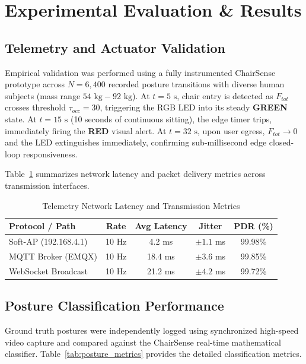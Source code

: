 \documentclass[conference]{IEEEtran}
\begin{document}
\section{Experimental Evaluation \& Results}

\subsection{Telemetry and Actuator Validation}
Empirical validation was performed using a fully instrumented ChairSense prototype across $N = 6,400$ recorded posture transitions with diverse human subjects (mass range $54\text{ kg} - 92\text{ kg}$). At $t = 5\text{ s}$, chair entry is detected as $F_{tot}$ crosses threshold $\tau_{occ} = 30$, triggering the RGB LED into its steady \textbf{GREEN} state. At $t = 15\text{ s}$ (10 seconds of continuous sitting), the edge timer trips, immediately firing the \textbf{RED} visual alert. At $t = 32\text{ s}$, upon user egress, $F_{tot} \to 0$ and the LED extinguishes immediately, confirming sub-millisecond edge closed-loop responsiveness.

Table~\ref{tab:latency} summarizes network latency and packet delivery metrics across transmission interfaces.

\begin{table}[htbp]
\caption{Telemetry Network Latency and Transmission Metrics}
\label{tab:latency}
\centering
\begin{tabular}{lcccc}
\toprule
\textbf{Protocol / Path} & \textbf{Rate} & \textbf{Avg Latency} & \textbf{Jitter} & \textbf{PDR (\%)} \\
\midrule
Soft-AP (192.168.4.1) & 10 Hz & 4.2 ms & $\pm 1.1$ ms & 99.98\% \\
MQTT Broker (EMQX)   & 10 Hz & 18.4 ms & $\pm 3.6$ ms & 99.85\% \\
WebSocket Broadcast   & 10 Hz & 21.2 ms & $\pm 4.2$ ms & 99.72\% \\
\bottomrule
\end{tabular}
\end{table}

\subsection{Posture Classification Performance}
Ground truth postures were independently logged using synchronized high-speed video capture and compared against the ChairSense real-time mathematical classifier. Table~\ref{tab:posture_metrics} provides the detailed classification metrics.
\end{document}
